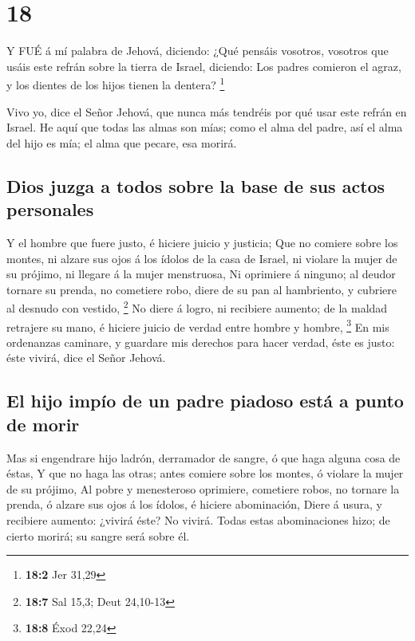 \hypertarget{section-17}{%
\section{18}\label{section-17}}

 Y FUÉ á mí palabra de Jehová, diciendo:  ¿Qué
pensáis vosotros, vosotros que usáis este refrán sobre la tierra de
Israel, diciendo: Los padres comieron el agraz, y los dientes de los
hijos tienen la dentera? \footnote{\textbf{18:2} Jer 31,29}

 Vivo yo, dice el Señor Jehová, que nunca más tendréis por
qué usar este refrán en Israel.  He aquí que todas las almas
son mías; como el alma del padre, así el alma del hijo es mía; el alma
que pecare, esa morirá.

\hypertarget{dios-juzga-a-todos-sobre-la-base-de-sus-actos-personales}{%
\subsection{Dios juzga a todos sobre la base de sus actos
personales}\label{dios-juzga-a-todos-sobre-la-base-de-sus-actos-personales}}

 Y el hombre que fuere justo, é hiciere juicio y justicia;
 Que no comiere sobre los montes, ni alzare sus ojos á los
ídolos de la casa de Israel, ni violare la mujer de su prójimo, ni
llegare á la mujer menstruosa,  Ni oprimiere á ninguno; al
deudor tornare su prenda, no cometiere robo, diere de su pan al
hambriento, y cubriere al desnudo con vestido, \footnote{\textbf{18:7}
  Sal 15,3; Deut 24,10-13}  No diere á logro, ni recibiere
aumento; de la maldad retrajere su mano, é hiciere juicio de verdad
entre hombre y hombre, \footnote{\textbf{18:8} Éxod 22,24} 
En mis ordenanzas caminare, y guardare mis derechos para hacer verdad,
éste es justo: éste vivirá, dice el Señor Jehová.

\hypertarget{el-hijo-impuxedo-de-un-padre-piadoso-estuxe1-a-punto-de-morir}{%
\subsection{El hijo impío de un padre piadoso está a punto de
morir}\label{el-hijo-impuxedo-de-un-padre-piadoso-estuxe1-a-punto-de-morir}}

 Mas si engendrare hijo ladrón, derramador de sangre, ó que
haga alguna cosa de éstas,  Y que no haga las otras; antes
comiere sobre los montes, ó violare la mujer de su prójimo,
 Al pobre y menesteroso oprimiere, cometiere robos, no
tornare la prenda, ó alzare sus ojos á los ídolos, é hiciere
abominación,  Diere á usura, y recibiere aumento: ¿vivirá
éste? No vivirá. Todas estas abominaciones hizo; de cierto morirá; su
sangre será sobre él.

